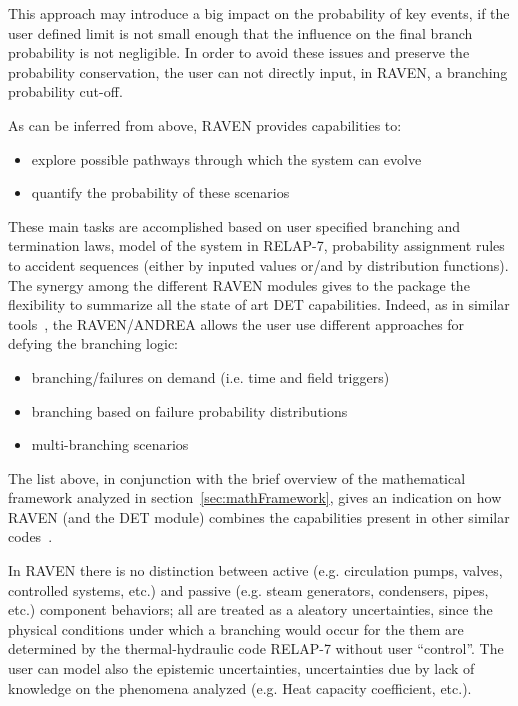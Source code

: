 \documentclass{mc2013}
\begin{document}
This approach may introduce a big impact on the probability of key events, if the user defined limit is not small enough that the influence on the final branch probability is not negligible.  In order to avoid these issues and preserve the probability conservation, the user can not directly input, in RAVEN, a branching probability cut-off. 

As can be inferred from above, RAVEN provides capabilities to:
\vspace{-5mm}
\begin{itemize}
\itemsep0em
\item explore possible pathways through which the system can evolve
\item quantify the probability of these scenarios
\end{itemize}
\vspace{-5mm}
These main tasks are accomplished based on user specified branching and termination laws, model of the system in RELAP-7, probability assignment rules to accident sequences (either by inputed values or/and by distribution functions).
The synergy among the different RAVEN modules gives to the package the flexibility to summarize all the state of art DET capabilities. Indeed, as in similar tools~\cite{ADAPTHakobyan}, the RAVEN/ANDREA allows the user use different approaches for defying the branching logic:
\vspace{-5mm}
\begin{itemize}
\itemsep0em
\item branching/failures on demand (i.e. time and field triggers)
\item branching based on failure probability distributions
\item multi-branching scenarios
\end{itemize}
\vspace{-5mm}
The list above, in conjunction with the brief overview of the mathematical framework analyzed in section~\ref{sec:mathFramework}, gives an indication on how RAVEN (and the DET module) combines the capabilities present in other similar codes~\cite{ADAPTHakobyan}.  

In RAVEN there is no distinction between active (e.g. circulation pumps, valves, controlled systems, etc.) and passive (e.g. steam generators, condensers, pipes, etc.) component behaviors; all are treated as a aleatory uncertainties, since the physical conditions under which a branching would occur for the them are determined by the thermal-hydraulic code RELAP-7 without user ``control''. The user can model also the epistemic uncertainties, uncertainties due by lack of knowledge on the phenomena analyzed (e.g. Heat capacity coefficient, etc.). 
\end{document}
